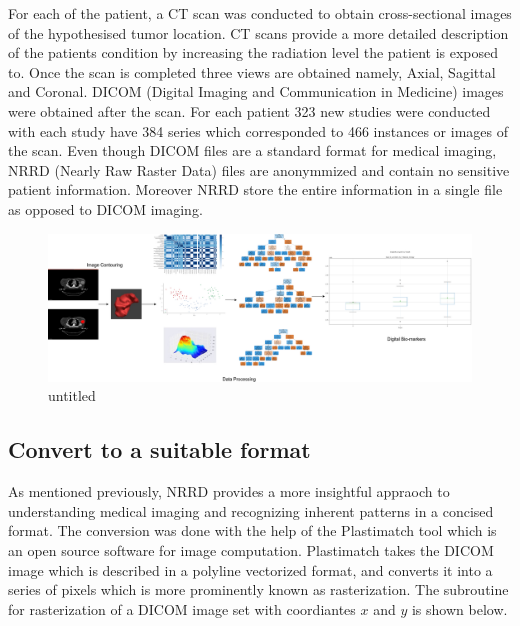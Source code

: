 \documentclass[10pt,journal,compsoc]{IEEEtran}
\begin{document}
For each of the patient, a CT scan was conducted to obtain cross-sectional images of the hypothesised tumor location. CT scans provide a more detailed description of the patients condition by increasing the radiation level the patient is exposed to. Once the scan is completed three views are obtained namely, Axial, Sagittal and Coronal. DICOM (Digital Imaging and Communication in Medicine) images were obtained after the scan. For each patient 323 new studies were conducted with each study have 384 series which corresponded to 466 instances or images of the scan. Even though DICOM files are a standard format for medical imaging, NRRD (Nearly Raw Raster Data) files are anonymmized and contain no sensitive patient information. Moreover NRRD store the entire information in a single file as opposed to DICOM imaging.



\begin{figure}[!b]
\centering
\includegraphics[width=7.5in]{im.png}
\caption{untitled}
\label{img2}
\end{figure}

\subsection{Convert to a suitable format}

As mentioned previously, NRRD provides a more insightful appraoch to understanding medical imaging and recognizing inherent patterns in a concised format. The conversion was done with the help of the Plastimatch tool which is an open source software for image computation. Plastimatch takes the DICOM image which is described in a polyline vectorized format, and converts it into a series of pixels which is more prominently known as rasterization. The subroutine for rasterization of a DICOM image set with coordiantes $x$ and $y$ is shown below.
\end{document}
